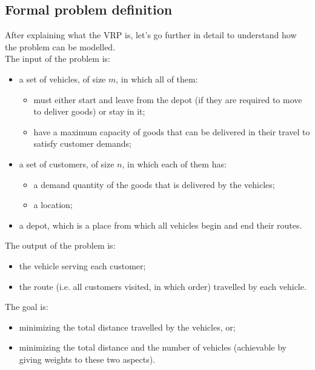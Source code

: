 \documentclass[../main.tex]{subfiles}
\begin{document}
\subsection{Formal problem definition}
After explaining what the VRP is, let's go further in detail to understand how the problem can be modelled.\\
The input of the problem is:
\begin{itemize}
    \item a set of vehicles, of size $m$, in which all of them:
    \begin{itemize}
        \item must either start and leave from the depot (if they are required to move to deliver goods) or stay in it;
        \item have a maximum capacity of goods that can be delivered in their travel to satisfy customer demands;
    \end{itemize}
    \item a set of customers, of size $n$, in which each of them has:
    \begin{itemize}
        \item a demand quantity of the goods that is delivered by the vehicles;
        \item a location;
    \end{itemize}
    \item a depot, which is a place from which all vehicles begin and end their routes.
\end{itemize}
The output of the problem is:
\begin{itemize}
    \item the vehicle serving each customer;
    \item the route (i.e. all customers visited, in which order) travelled by each vehicle.
\end{itemize}
The goal is:
\begin{itemize}
    \item minimizing the total distance travelled by the vehicles, or;
    \item minimizing the total distance and the number of vehicles (achievable by giving weights to these two aspects).
\end{itemize}
\end{document}
